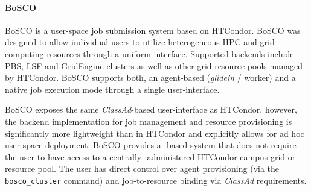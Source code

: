 \documentclass{sig-alternate}
\begin{document}
\paragraph{BoSCO}



BoSCO is a user-space job submission system based on HTCondor. BoSCO was
designed to allow individual users to utilize heterogeneous HPC and grid
computing resources through a uniform interface. Supported backends include
PBS, LSF and GridEngine clusters as well as other  grid resource pools managed
by HTCondor. BoSCO supports both, an agent-based (\textit{glidein} / worker)
and a native job execution mode through a single user-interface.

BoSCO exposes the same \textit{ClassAd}-based user-interface as HTCondor,
however, the backend implementation for job management and resource
provisioning is significantly more lightweight than in HTCondor and explicitly
allows for ad hoc user-space deployment. BoSCO provides a \pilotjob-based
system that does not require the user to have access to a centrally-
administered HTCondor campus grid or  resource pool. The user has direct
control over \pilotjob agent provisioning (via the \texttt{bosco\_cluster}
command) and job-to-resource binding via \textit{ClassAd} requirements.
\end{document}
